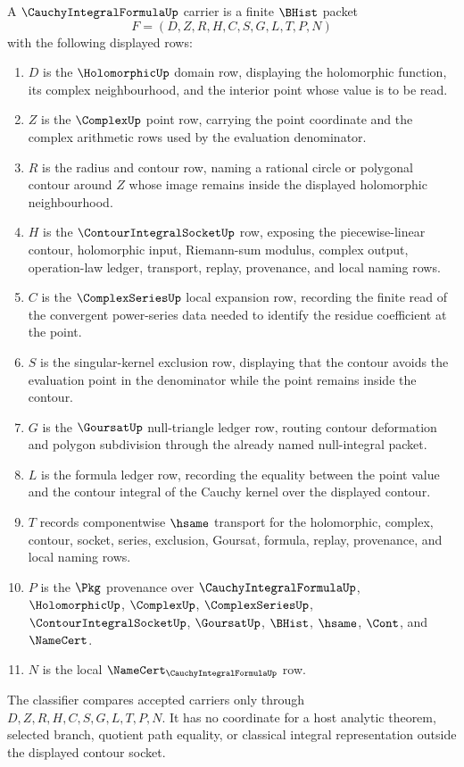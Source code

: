 \begin{definition}
\label{def:cauchy-integral-formula-carrier}
A $\CauchyIntegralFormulaUp$ carrier is a finite $\BHist$ packet
$$
F=(D,Z,R,H,C,S,G,L,T,P,N)
$$
with the following displayed rows:
\begin{enumerate}
\item $D$ is the $\HolomorphicUp$ domain row, displaying the holomorphic function, its complex neighbourhood, and the interior point whose value is to be read.
\item $Z$ is the $\ComplexUp$ point row, carrying the point coordinate and the complex arithmetic rows used by the evaluation denominator.
\item $R$ is the radius and contour row, naming a rational circle or polygonal contour around $Z$ whose image remains inside the displayed holomorphic neighbourhood.
\item $H$ is the $\ContourIntegralSocketUp$ row, exposing the piecewise-linear contour, holomorphic input, Riemann-sum modulus, complex output, operation-law ledger, transport, replay, provenance, and local naming rows.
\item $C$ is the $\ComplexSeriesUp$ local expansion row, recording the finite read of the convergent power-series data needed to identify the residue coefficient at the point.
\item $S$ is the singular-kernel exclusion row, displaying that the contour avoids the evaluation point in the denominator while the point remains inside the contour.
\item $G$ is the $\GoursatUp$ null-triangle ledger row, routing contour deformation and polygon subdivision through the already named null-integral packet.
\item $L$ is the formula ledger row, recording the equality between the point value and the contour integral of the Cauchy kernel over the displayed contour.
\item $T$ records componentwise $\hsame$ transport for the holomorphic, complex, contour, socket, series, exclusion, Goursat, formula, replay, provenance, and local naming rows.
\item $P$ is the $\Pkg$ provenance over $\CauchyIntegralFormulaUp$, $\HolomorphicUp$, $\ComplexUp$, $\ComplexSeriesUp$, $\ContourIntegralSocketUp$, $\GoursatUp$, $\BHist$, $\hsame$, $\Cont$, and $\NameCert$.
\item $N$ is the local $\NameCert_{\CauchyIntegralFormulaUp}$ row.
\end{enumerate}
The classifier compares accepted carriers only through $D,Z,R,H,C,S,G,L,T,P,N$. It has no coordinate for a host analytic theorem, selected branch, quotient path equality, or classical integral representation outside the displayed contour socket.
\end{definition}

